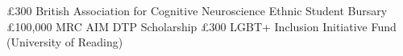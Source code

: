{%
	£300}
{%
	British Association for Cognitive Neuroscience Ethnic Student Bursary}
{}
\vspace{0.5em}
{%
	£100,000}
{%
	MRC AIM DTP Scholarship}
{}
\vspace{0.5em}
\datedsubsectionnarrow{}
{%
	£300}
{%
	LGBT+ Inclusion Initiative Fund (University of Reading)}
{}
